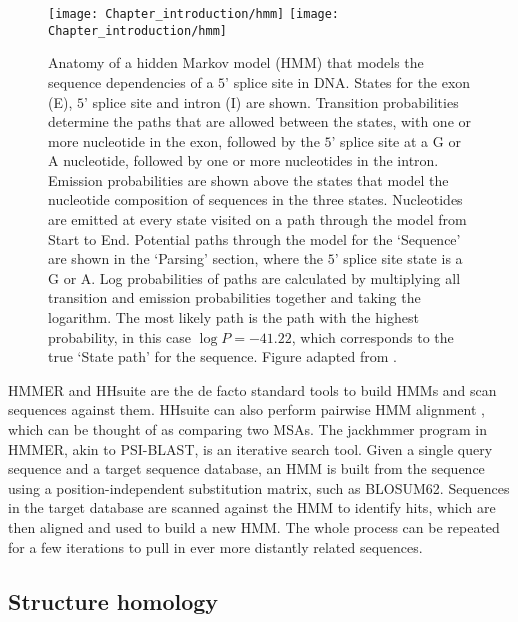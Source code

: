 \begin{figure}[!hbt]
    \centering
    \ifredact
        \texttt{[image: Chapter\_introduction/hmm]}
    \else
        \texttt{[image: Chapter\_introduction/hmm]}
    \fi
    \caption{%
        Anatomy of a hidden Markov model (HMM) that models the sequence dependencies of a $5$' splice site in DNA.
        States for the exon (E), $5$' splice site and intron (I) are shown.
        Transition probabilities determine the paths that are allowed between the states, with one or more nucleotide in the exon, followed by the $5$' splice site at a G or A nucleotide, followed by one or more nucleotides in the intron.
        Emission probabilities are shown above the states that model the nucleotide composition of sequences in the three states.
        Nucleotides are emitted at every state visited on a path through the model from Start to End.
        Potential paths through the model for the `Sequence' are shown in the `Parsing' section, where the $5$' splice site state is a G or A.
        Log probabilities of paths are calculated by multiplying all transition and emission probabilities together and taking the logarithm.
        The most likely path is the path with the highest probability, in this case $\log P = -41.22$, which corresponds to the true `State path' for the sequence.
        Figure adapted from \cite{Eddy2004}.
    }
    \label{fig:hmm}
\end{figure}

HMMER \cite{Mistry2013} and HHsuite \cite{Steinegger2019} are the de facto standard tools to build HMMs and scan sequences against them. HHsuite can also perform pairwise HMM alignment \cite{Soding2005}, which can be thought of as comparing two MSAs. The jackhmmer program in HMMER, akin to PSI-BLAST, is an iterative search tool. Given a single query sequence and a target sequence database, an HMM is built from the sequence using a position-independent substitution matrix, such as BLOSUM62. Sequences in the target database are scanned against the HMM to identify hits, which are then aligned and used to build a new HMM. The whole process can be repeated for a few iterations to pull in ever more distantly related sequences.

\subsection{Structure homology}


